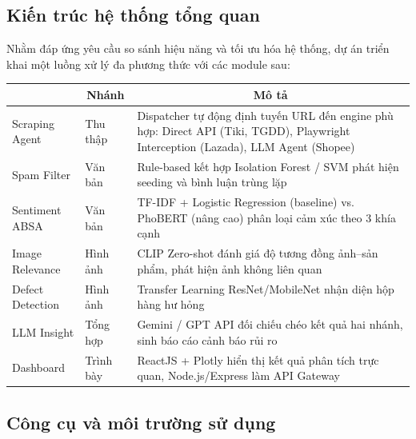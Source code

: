 \subsection{Kiến trúc hệ thống tổng quan}

Nhằm đáp ứng yêu cầu so sánh hiệu năng và tối ưu hóa hệ thống, dự án triển khai một luồng xử lý đa phương thức với các module sau:

\begin{center}
\renewcommand{\arraystretch}{1.4}
\begin{tabularx}{\textwidth}{|l|l|X|}
\hline
\rowcolor[HTML]{E8E8E8}
\multicolumn{1}{|c|}{\textbf{Module}} & 
\multicolumn{1}{|c|}{\textbf{Nhánh}} & 
\multicolumn{1}{|c|}{\textbf{Mô tả}} \\
\hline
Scraping Agent & Thu thập & Dispatcher tự động định tuyến URL đến engine phù hợp: Direct API (Tiki, TGDD), Playwright Interception (Lazada), LLM Agent (Shopee) \\
\hline
Spam Filter & Văn bản & Rule-based kết hợp Isolation Forest / SVM phát hiện seeding và bình luận trùng lặp \\
\hline
Sentiment ABSA & Văn bản & TF-IDF + Logistic Regression (baseline) vs. PhoBERT (nâng cao) phân loại cảm xúc theo 3 khía cạnh \\
\hline
Image Relevance & Hình ảnh & CLIP Zero-shot đánh giá độ tương đồng ảnh--sản phẩm, phát hiện ảnh không liên quan \\
\hline
Defect Detection & Hình ảnh & Transfer Learning ResNet/MobileNet nhận diện hộp hàng hư hỏng \\
\hline
LLM Insight & Tổng hợp & Gemini / GPT API đối chiếu chéo kết quả hai nhánh, sinh báo cáo cảnh báo rủi ro \\
\hline
Dashboard & Trình bày & ReactJS + Plotly hiển thị kết quả phân tích trực quan, Node.js/Express làm API Gateway \\
\hline
\end{tabularx}
\end{center}

\subsection{Công cụ và môi trường sử dụng}

